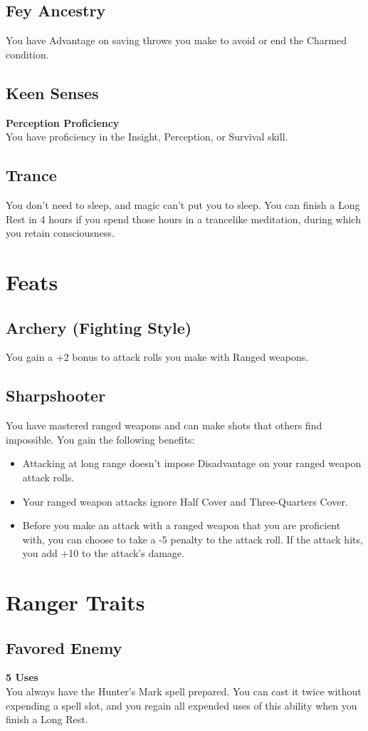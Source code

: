 \documentclass[letterpaper,openany,oneside,twocolumn]{book}
\begin{document}
\subsection*{Fey Ancestry}
You have Advantage on saving throws you make to avoid or end the Charmed condition.
\subsection*{Keen Senses}
\textbf{Perception Proficiency}\\
You have proficiency in the Insight, Perception, or Survival skill.
\subsection*{Trance}
You don't need to sleep, and magic can't put you to sleep. You can finish a Long Rest in 4 hours if you spend those hours in a trancelike meditation, during which you retain consciousness.

\section*{Feats}
\subsection*{Archery (Fighting Style)}
You gain a +2 bonus to attack rolls you make with Ranged weapons.
\subsection*{Sharpshooter}
You have mastered ranged weapons and can make shots that others find impossible. You gain the following benefits:
\begin{itemize}
	\item Attacking at long range doesn't impose Disadvantage on your ranged weapon attack rolls.
	\item Your ranged weapon attacks ignore Half Cover and Three-Quarters Cover.
	\item Before you make an attack with a ranged weapon that you are proficient with, you can choose to take a -5 penalty to the attack roll. If the attack hits, you add +10 to the attack's damage.
\end{itemize}

\section*{Ranger Traits}
\subsection*{Favored Enemy}
\textbf{5 Uses}\\
You always have the Hunter's Mark spell prepared. You can cast it twice without expending a spell slot, and you regain all expended uses of this ability when you finish a Long Rest.
\end{document}
